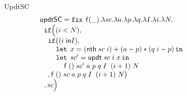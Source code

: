 \documentclass[a4paper,11pt]{article}
\theoremstyle{definition}
\begin{document}
\begin{figure}
UpdtSC
\[
\begin{array}{l}
 \mathsf{updtSC} = \mathop{\mathtt{fix}} \;  \mathsf{f}(\_). \lambda sc. \lambda a. \lambda
  p. \lambda q.  \lambda I. \lambda i. \lambda N. \\
 \hspace{.2cm} \mathtt{if}   \Big (   (i < N)  ,  \\
 \hspace{0.4cm}  \mathtt{if} \big( ( i \; \mathsf{in} I  ) ,       \\
 \hspace{0.8cm} \mathop{\mathtt{let}} \; x =( \mathsf{nth} \; sc \; i) + (a-p)*(q
  \; i - p)  \mathop{ \mathtt{in}} \\
 \hspace{0.8cm} \mathop{\mathtt{let}} \; sc' =  \mathsf{updt} \; sc \; i
  \; x \mathop{ \mathtt{in}} \\
  \hspace{1.2cm} \mathsf{f}  \; () \; sc' \; a \; p
 \; q \; I \;  \; (i+1) \;  N  \\ 
\hspace{0.4cm}  ,  \mathsf{f}  \; () \; sc \; a \; p
 \; q \; I \;  \; (i+1) \;  N \big )  \\ 
\hspace{0.2cm}   ,  sc  \Big ) \\
 

\end{array}\]
\end{figure}
\end{document}
